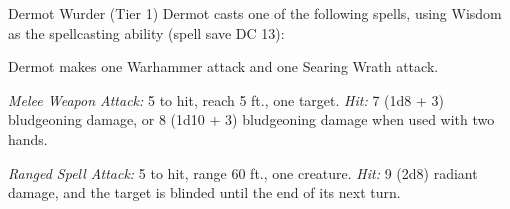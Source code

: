 \documentclass[10pt,a4paper,twoside,bg=print,twocolumn,openany,nodeprecatedcode]{dndbook}
\begin{document}
\begin{DndMonster}[float=t]{Dermot Wurder (Tier 1)}
\DndMonsterBasics[
armor-class = {17 (\textit{breastplate})},
hit-points = {\DndDice{8d6 + 16}},
speed = {30 ft.}
]
\DndMonsterAbilityScores[
 str = 16,
 dex = 12,
 con = 14,
 int = 10,
 wis = 16,
 cha = 10
]
\DndMonsterDetails[
saving-throws = {Wis +5, Cha +2},
skills = {Medicine +5, Religion +2, Survival +5},
senses = {darkvision 60 ft., passive perception 13},
languages = {Common, Goblin, Orc},
challenge = 3,
]
Dermot casts one of the following spells, using Wisdom as the spellcasting ability (spell save DC 13):
\begin{DndMonsterSpells}
\end{DndMonsterSpells}
Dermot makes one Warhammer attack and one Searing Wrath attack.

\textsl{Melee Weapon Attack:} 5 to hit, reach 5 ft., one target. \textsl{Hit:} 7 (1d8 + 3) bludgeoning damage, or 8 (1d10 + 3) bludgeoning damage when used with two hands.

\textsl{Ranged Spell Attack:} 5 to hit, range 60 ft., one creature. \textsl{Hit:} 9 (2d8) radiant damage, and the target is blinded until the end of its next turn.

\end{DndMonster}
\end{document}
